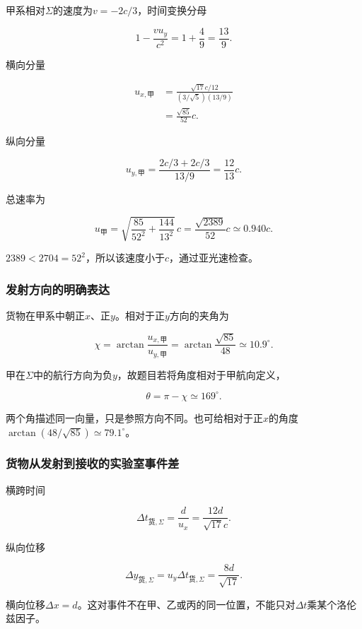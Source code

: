 \documentclass[12pt,a4paper,fontset=fandol]{ctexart}
\begin{document}
甲系相对\(\Sigma\)的速度为\(v=-2c/3\)，时间变换分母

\[
1-\frac{vu_y}{c^2}
=1+\frac49=\frac{13}{9}.
\]

横向分量

\[
\begin{aligned}
u_{x,\text{甲}}
&=\frac{\sqrt{17}c/12}
{(3/\sqrt5)(13/9)}\\
&=\boxed{\frac{\sqrt{85}}{52}c}.
\end{aligned}
\]

纵向分量

\[
u_{y,\text{甲}}
=\frac{2c/3+2c/3}{13/9}
=\boxed{\frac{12}{13}c}.
\]

总速率为

\[
\boxed{
u_{\text{甲}}
=\sqrt{\frac{85}{52^2}+\frac{144}{13^2}}\,c
=\frac{\sqrt{2389}}{52}c
\simeq0.940c}.
\]

\(2389<2704=52^2\)，所以该速度小于\(c\)，通过亚光速检查。

\subsubsection{发射方向的明确表达}\label{ux53d1ux5c04ux65b9ux5411ux7684ux660eux786eux8868ux8fbe}

货物在甲系中朝正\(x\)、正\(y\)。相对于正\(y\)方向的夹角为

\[
\chi=\arctan\frac{u_{x,\text{甲}}}{u_{y,\text{甲}}}
=\arctan\frac{\sqrt{85}}{48}
\simeq10.9^\circ.
\]

甲在\(\Sigma\)中的航行方向为负\(y\)，故题目若将角度相对于甲航向定义，

\[
\boxed{\theta=\pi-\chi\simeq169^\circ}.
\]

两个角描述同一向量，只是参照方向不同。也可给相对于正\(x\)的角度\(\arctan(48/\sqrt{85})\simeq79.1^\circ\)。

\subsubsection{货物从发射到接收的实验室事件差}\label{ux8d27ux7269ux4eceux53d1ux5c04ux5230ux63a5ux6536ux7684ux5b9eux9a8cux5ba4ux4e8bux4ef6ux5dee}

横跨时间

\[
\boxed{
\Delta t_{\text{货},\Sigma}
=\frac d{u_x}
=\frac{12d}{\sqrt{17}c}}.
\]

纵向位移

\[
\boxed{
\Delta y_{\text{货},\Sigma}
=u_y\Delta t_{\text{货},\Sigma}
=\frac{8d}{\sqrt{17}}}.
\]

横向位移\(\Delta x=d\)。这对事件不在甲、乙或丙的同一位置，不能只对\(\Delta t\)乘某个洛伦兹因子。
\end{document}
